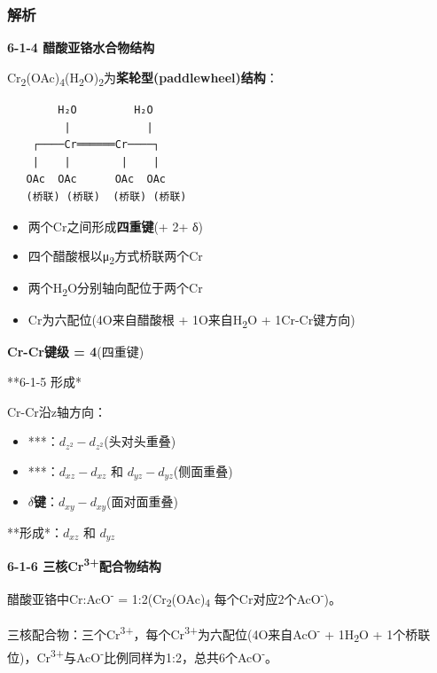 \subsubsection{解析}\label{ux89e3ux6790-21}

\textbf{6-1-4 醋酸亚铬水合物结构}

Cr\textsubscript{2}(OAc)\textsubscript{4}(H\textsubscript{2}O)\textsubscript{2}为\textbf{桨轮型(paddlewheel)结构}：

\begin{verbatim}
        H₂O         H₂O
         |            |
    ┌────Cr══════Cr────┐
    |    |        |    |
   OAc  OAc      OAc  OAc
   (桥联) (桥联)  (桥联) (桥联)
\end{verbatim}

\begin{itemize}
\tightlist
\item
  两个Cr之间形成\textbf{四重键}( + 2\派 + δ)
\item
  四个醋酸根以μ\textsubscript{2}方式桥联两个Cr
\item
  两个H\textsubscript{2}O分别轴向配位于两个Cr
\item
  Cr为六配位(4O来自醋酸根 + 1O来自H\textsubscript{2}O + 1Cr-Cr键方向)
\end{itemize}

\textbf{Cr-Cr键级 = 4}(四重键)

**6-1-5 形成*

Cr-Cr沿z轴方向：

\begin{itemize}
\tightlist
\item
  ***：\(d_{z^2} - d_{z^2}\)(头对头重叠)
\item
  ***：\(d_{xz} - d_{xz}\) 和 \(d_{yz} - d_{yz}\)(侧面重叠)
\item
  \textbf{\(\delta\)键}：\(d_{xy} - d_{xy}\)(面对面重叠)
\end{itemize}

**形成*：\(d_{xz}\) 和 \(d_{yz}\)

\textbf{6-1-6 三核Cr\textsuperscript{3+}配合物结构}

醋酸亚铬中Cr:AcO\textsuperscript{-} = 1:2(Cr\textsubscript{2}(OAc)\textsubscript{4} \箭 每个Cr对应2个AcO\textsuperscript{-})。

三核配合物：三个Cr\textsuperscript{3+}，每个Cr\textsuperscript{3+}为六配位(4O来自AcO\textsuperscript{-} + 1H\textsubscript{2}O + 1个桥联位)，Cr\textsuperscript{3+}与AcO\textsuperscript{-}比例同样为1:2，总共6个AcO\textsuperscript{-}。

